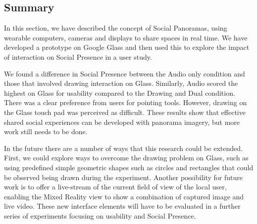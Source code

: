 \subsection{Summary}

In this section, we have described the concept of Social Panoramas, using wearable computers, cameras and displays to share spaces in real time. We have developed a prototype on Google Glass and then used this to explore the impact of interaction on Social Presence in a user study. 

We found a difference in Social Presence between the Audio only condition and those that involved drawing interaction on Glass. Similarly, Audio scored the highest on Glass for usability compared to the Drawing and Dual condition. There was a clear preference from users for pointing tools. However, drawing on the Glass touch pad was perceived as difficult. These results show that effective shared social experiences can be developed with panorama imagery, but more work still needs to be done.

In the future there are a number of ways that this research could be extended. First, we could explore ways to overcome the drawing problem on Glass, such as using predefined simple geometric shapes such as circles and rectangles that could be observed being drawn during the experiment. Another possibility for future work is to offer a live-stream of the current field of view of the local user, enabling the Mixed Reality view to show a combination of captured image and live video. These new interface elements will have to be evaluated in a further series of experiments focusing on usability and Social Presence.

